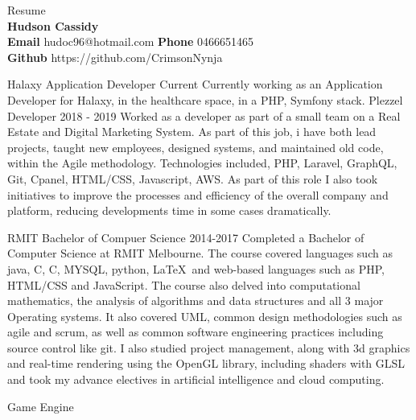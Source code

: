 \documentclass[9pt]{developercv}
\newcommand{\CC}{C\nolinebreak\hspace{-.05em}\raisebox{.4ex}{\tiny\bf +}\nolinebreak\hspace{-.10em}\raisebox{.4ex}{\tiny\bf +}}
\def\CC{{C\nolinebreak[4]\hspace{-.05em}\raisebox{.4ex}{\tiny\bf ++}}}
\begin{document}
	\begin{minipage}[a]{1.0\textwidth}
		\begin{center}
			{\HUGE Resume}\\
			\textbf {Hudson Cassidy} \\
			\textbf {Email} hudoc96@hotmail.com
			\textbf {Phone} 0466651465 \\
			\textbf {Github} https://github.com/CrimsonNynja \\
		\end{center}
	\end{minipage}
	\begin{minipage}[t]{0.6\textwidth}
		\begin{entrylist}
			\entry
				{Halaxy}
				{Application Developer}
				{Current}
				{Currently working as an Application Developer for Halaxy, in the healthcare space, in a PHP, Symfony stack.}
			\entry
				{Plezzel}
				{Developer}
				{2018 - 2019}
				{Worked as a developer as part of a small team on a Real Estate and Digital Marketing System. As part of this job, i have both lead projects, taught new employees, designed systems, and maintained old code, within the Agile methodology. Technologies included, PHP, Laravel, GraphQL, Git, Cpanel, HTML/CSS, Javascript, AWS. As part of this role I also took initiatives to improve the processes and efficiency of the overall company and platform, reducing developments time in some cases dramatically.}
		\end{entrylist}	
		\cvsect{Education}
		\begin{entrylist}
			\entry
				{RMIT}
				{Bachelor of Compuer Science}
				{2014-2017}
				{Completed a Bachelor of Computer Science at RMIT Melbourne. The course covered languages such as java, C, \CC, MYSQL, python, \LaTeX  \  and web-based languages such as PHP, HTML/CSS and JavaScript. The course also delved into computational mathematics, the analysis of algorithms and data structures and all 3 major Operating systems. It also covered UML, common design methodologies such as agile and scrum, as well as common software engineering practices including source control like git. I also studied project management, along with 3d graphics and real-time rendering using the OpenGL library, including shaders with GLSL and took my advance electives in artificial intelligence and cloud computing.}
		\end{entrylist}
		\cvsect{Personal Projects}
		\begin{entrylist}
			\entry
				{\vphantom{1.0}}
				{Game Engine}

\end{entrylist}
\end{minipage}
\end{document}
